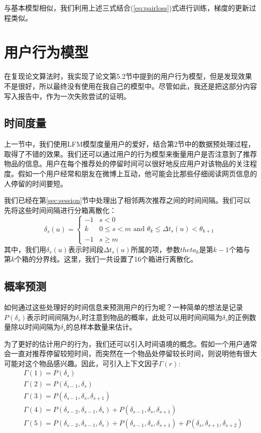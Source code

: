 \documentclass[12pt]{article} %
\begin{document}
\begin{sloppypar}
与基本模型相似，我们利用上述三式结合(\ref{eq:pairloss})式进行训练，梯度的更新过程类似。


\section{用户行为模型}

在复现论文算法时，我实现了论文第5.2节中提到的用户行为模型，但是发现效果不是很好，所以最终没有使用在我自己的模型中。尽管如此，我还是把这部分内容写入报告中，作为一次失败尝试的证明。

\subsection{时间度量}

上一节中，我们使用LFM模型度量用户的爱好，结合第2节中的数据预处理过程，取得了不错的效果。我们还可以通过用户的行为模型来衡量用户是否注意到了推荐物品的信息。用户在每个推荐处的停留时间可以很好地反应用户对该物品的关注程度。假如一个用户经常和朋友在微博上互动，他可能会比那些仔细阅读网页信息的人停留的时间要短。

我们已经在第\ref{sec:session}节中处理出了相邻两次推荐之间的时间间隔。我们可以先将这些时间间隔进行分箱离散化：
\begin{equation}
\delta_s(u) =
\begin{cases}
-1 & s<0 \\
k & 0\le s < m \text{ and } \theta_k \le \Delta t_s(u) < \theta_{k+1} \\
-1 & s\ge m
\end{cases}
\end{equation}
其中，我们用$\delta_s(u)$表示时间段$\Delta t_s(u)$所属的项，参数$theta_k$是第$k-1$个箱与第$k$个箱的分界线。这里，我们一共设置了16个箱进行离散化。

\subsection{概率预测}

如何通过这些处理好的时间信息来预测用户的行为呢？一种简单的想法是记录$P(\delta_s)$表示时间间隔为$\delta_s$时注意到物品的概率，此处可以用时间间隔为$\delta_s$的正例数量除以时间间隔为$\delta_s$的总样本数量来估计。

为了更好的估计用户的行为，我们还可以引入时间语境的概念。假如一个用户通常会一直对推荐停留较短时间，而突然在一个物品处停留较长时间，则说明他有很大可能对这个物品感兴趣。因此，可引入上下文因子$\Gamma(r)$:
\begin{align}
&\Gamma(1) = P(\delta_s) \\
&\Gamma(2) = P(\delta_{s-1},\delta_s) \\
&\Gamma(3) = P(\delta_{s-1},\delta_s,\delta_{s+1}) \\
&\Gamma(4) = P(\delta_{s-2},\delta_{s-1},\delta_s) + P(\delta_{s-1},\delta_s,\delta_{s+1}) \\
&\Gamma(5) = P(\delta_{s-2},\delta_{s-1},\delta_s) + P(\delta_{s-1},\delta_s,\delta_{s+1}) + P(\delta_s,\delta_{s+1},\delta_{s+2})
\end{align}


\end{sloppypar}
\end{document}
